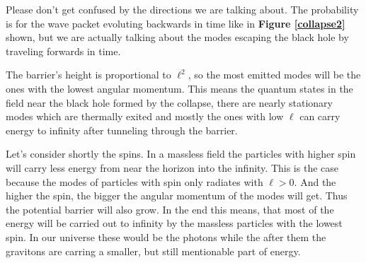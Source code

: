 	Please don't get confused by the directions we are talking about. The probability is for the wave packet evoluting backwards in time like in \textbf{Figure \ref{collapse2}} shown, but we are actually talking about the modes escaping the black hole by traveling forwards in time.
	 
	The barrier's height is proportional to $\ell^2$, so the most emitted modes will be the ones with the lowest angular momentum. This means the quantum states in the field near the black hole formed by the collapse, there are nearly stationary modes which are thermally exited and mostly the ones with low $\ell$ can carry energy to infinity after tunneling through the barrier. 
	
	Let's consider shortly the spins. In a massless field the particles with higher spin will carry less energy from near the horizon into the infinity. This is the case because the modes of particles with spin only radiates with $\ell >0$. And the higher the spin, the bigger the angular momentum of the modes will get. Thus the potential barrier will also grow. In the end this means, that most of the energy will be carried out to infinity by the massless particles with the lowest spin. In our universe these would be the photons while the after them the gravitons are carring a smaller, but still mentionable part of energy. 